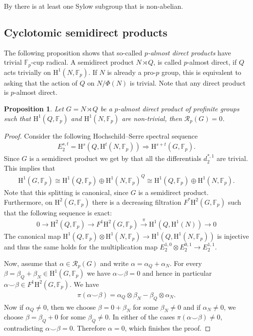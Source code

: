 \documentclass{amsart}
\newtheorem{prop}[thm]{Proposition}
\theoremstyle{definition}
\theoremstyle{remark}
\newcommand{\FF}{\mathbb{F}}
\newcommand{\calR}{\mathcal{R}}
\newcommand{\rmH}{\mathrm H}%
\begin{document}
By \cite[Cor. 1.2]{LSZ24} there is at least one Sylow subgroup that is non-abelian.


\subsection{Cyclotomic semidirect products}
The following proposition shows that so-called \emph{$p$-almost direct products} have trivial $\FF_p$-cup radical. A semidirect product $N\rtimes Q$, is called $p$-almost direct, if $Q$ acts trivially on $\rmH^1(N,\FF_p)$. If $N$ is already a pro-$p$ group, this is equivalent to asking that the action of $Q$ on $N/\Phi(N)$ is trivial. Note that any direct product is $p$-almost direct.
\begin{prop}
\label{prop:almost direct product}
    Let $G=N\rtimes Q$ be a $p$-almost direct product of profinite groups such that $\rmH^1(Q,\FF_p)$ and $\rmH^1(N,\FF_p)$ are non-trivial, then $\calR_p(G)=0$.
\end{prop}
\begin{proof}
    Consider the following Hochschild--Serre spectral sequence 
    \begin{align*}
        E_2^{s,t}=\rmH^s(Q,\rmH^t(N,\FF_p))\Longrightarrow \rmH^{s+t}(G,\FF_p).
    \end{align*}
    Since $G$ is a semidirect product we get by \cite[Prop. 2.4.5]{NSW2008} that all the differentials $d^{*,1}_2$ are trivial. This implies that 
    \begin{align*}
        \rmH^1(G,\FF_p)\cong \rmH^1(Q,\FF_p)\oplus \rmH^1(N,\FF_p)^Q\cong \rmH^1(Q,\FF_p)\oplus \rmH^1(N,\FF_p).
    \end{align*}
    Note that this splitting is canonical, since $G$ is a semidirect product. Furthermore, on $\rmH^2(G,\FF_p)$ there is a decreasing filtration $F^*\rmH^2(G,\FF_p)$ such that the following sequence is exact:
    \begin{align*}
        0\to \rmH^2(Q,\FF_p)\to F^1\rmH^2(G,\FF_p)\overset{\pi}\to \rmH^1(Q,\rmH^1(N))\to 0
    \end{align*}
    The canonical map $\rmH^1(Q,\FF_p)\otimes \rmH^1(N,\FF_p) \to\rmH^1(Q,\rmH^1(N,\FF_p))$ is injective and thus the same holds for the multiplication map $E_2^{1,0}\otimes E_2^{0,1}\to E_2^{1,1}$.

    Now, assume that $\alpha\in \calR_p(G)$ and write $\alpha=\alpha_Q+\alpha_N$. For every $\beta=\beta_Q+\beta_N\in \rmH^1(G,\FF_p)$ we have $\alpha\smallsmile \beta=0$ and hence in particular $\alpha\smallsmile \beta\in F^1\rmH^2(G,\FF_p)$. We have 
    \begin{align*}
        \pi(\alpha\smallsmile \beta)=\alpha_Q\otimes \beta_N-\beta_Q\otimes \alpha_N.
    \end{align*}
    Now if $\alpha_Q\neq 0$, then we choose $\beta=0+\beta_N$ for some $\beta_N\neq 0$ and if $\alpha_N\neq 0$, we choose $\beta=\beta_Q+0$ for some $\beta_Q\neq 0$. In either of the cases $\pi(\alpha\smallsmile \beta)\neq 0$, contradicting $\alpha \smallsmile \beta=0$. Therefore $\alpha=0$, which finishes the proof.
\end{proof}
\end{document}

